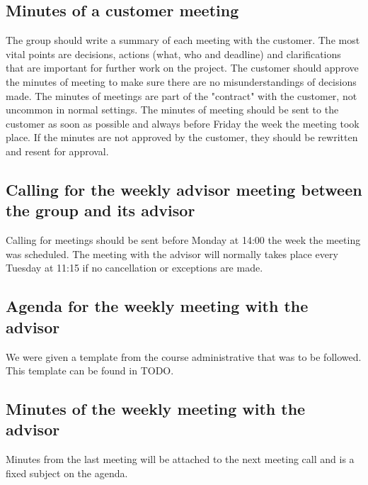 \newpage

\subsection{Minutes of a customer meeting}
The group should write a summary of each meeting with the customer. The most vital points are decisions, actions (what, who and deadline) and clarifications that are important for further work on the project. The customer should approve the minutes of meeting to make sure there are no misunderstandings of decisions made. The minutes of meetings are part of the "contract" with the customer, not uncommon in normal settings.
\newline
\newline
The minutes of meeting should be sent to the customer as soon as possible and always before Friday the week the meeting took place. If the minutes are not approved by the customer, they should be rewritten and resent for approval.

\subsection{Calling for the weekly advisor meeting between the group and its advisor}
Calling for meetings should be sent before Monday at 14:00 the week the meeting was scheduled. The meeting with the advisor will normally takes place every Tuesday at 11:15 if no cancellation or exceptions are made.

\subsection{Agenda for the weekly meeting with the advisor}
We were given a template from the course administrative that was to be followed. This template can be found in TODO.

\subsection{Minutes of the weekly meeting with the advisor}
Minutes from the last meeting will be attached to the next meeting call and is a fixed subject on the agenda.


